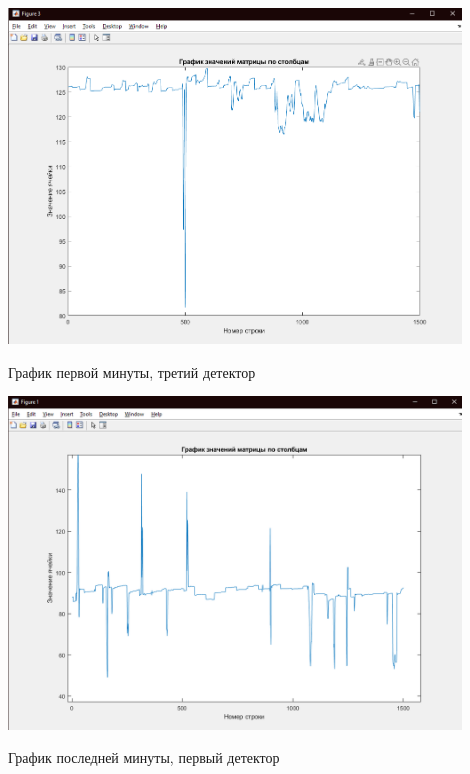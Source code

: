 \documentclass[a4paper,12pt]{article}
\begin{document}
\begin{center}
\includegraphics[width=0.9\textwidth]{images/median/median_color_first_3.png}
\end{center}
\begin{center}
График первой минуты, третий детектор
\end{center}

\begin{center}
\includegraphics[width=0.9\textwidth]{images/median/median_color_last_1.png}
\end{center}
\begin{center}
График последней минуты, первый детектор
\end{center}
\end{document}
